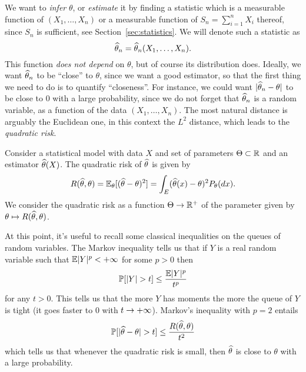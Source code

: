 We want to \emph{infer} $\theta$, or \emph{estimate} it by finding a statistic which is a measurable function of $(X_1, \ldots, X_n)$%
%
or a measurable function of $S_n = \sum_{i=1}^n X_i$ thereof, since $S_n$ is sufficient, see Section~\ref{sec:statistics}.
We will denote such a statistic as
\begin{equation*}
 	\widehat \theta_n = \widehat \theta_n(X_1, \ldots, X_n).
\end{equation*}
This function \emph{does not depend} on $\theta$, but of course its distribution does.
Ideally, we want $\widehat \theta_n$ to be ``close'' to $\theta$, since we want a good estimator, so that the first thing we need to do is to quantify ``closeness''.
For instance, we could want $|\widehat \theta_n - \theta|$ to be close to $0$ with a large probability, since we do not forget that $\widehat \theta_n$ is a random variable, as a function of the data $(X_1, \ldots, X_n)$.
The most natural distance is arguably the Euclidean one, in this context the $L^2$ distance, 
which leads to the \emph{quadratic risk}.%
\begin{definition}
	\label{def:quadratic_risk}
	Consider a statistical model with data $X$ and set of parameters $\Theta \subset \mathbb R$ and an estimator $\widehat \theta(X)$. 
	The quadratic risk of $\widehat \theta$ is given by
	\begin{equation*}
		R(\widehat \theta, \theta) = \mathbb E_\theta[ (\widehat \theta - \theta)^2 ] = \int_E (\widehat \theta(x) - \theta)^2 P_\theta(dx).
	\end{equation*}
	We consider the quadratic risk as a function $\Theta \rightarrow \mathbb R^+$ of the parameter given by $\theta \mapsto R(\widehat \theta, \theta)$.
\end{definition}
At this point, it's useful to recall some classical inequalities on the queues of random variables.
The Markov inequality tells us that if $Y$ is a real random variable such that $\mathbb E |Y|^p < +\infty$ for some $p > 0$ then
\begin{equation*}
	\mathbb P[|Y| > t] \leq \frac{\mathbb E |Y|^p}{t^p}
\end{equation*}
for any $t > 0$.
This tells us that the more $Y$ has moments%
%
the more the queue of $Y$ is tight (it goes faster to $0$ with $t \rightarrow +\infty$).
Markov's inequality with $p=2$ entails 
\begin{equation}
	\label{eq:l2_entrails_proba}
	\mathbb P[|\widehat \theta - \theta| > t] \leq \frac{R(\widehat \theta, \theta)}{t^2}
\end{equation}
which tells us that whenever the quadratic risk is small, then $\widehat \theta$ is close to $\theta$ with a large probability.

